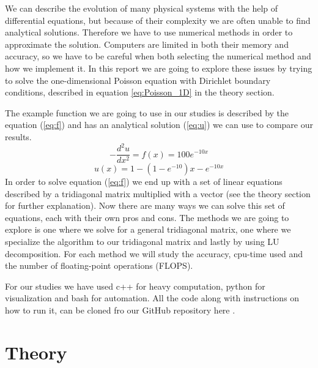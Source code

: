 \documentclass[reprint, english,notitlepage]{revtex4-1}  %
\begin{document}
We can describe the evolution of many physical systems with the help of differential equations, but because of their complexity we are often unable to find analytical solutions. Therefore we have to use numerical methods in order to approximate the solution. Computers are limited in both their memory and accuracy, so we have to be careful when both selecting the numerical method and how we implement it. In this report we are going to explore these issues by trying to solve the one-dimensional Poisson equation with Dirichlet boundary conditions, described in equation \ref{eq:Poisson_1D} in the theory section.

The example function we are going to use in our studies is described by the equation (\ref{eq:f}) and has an analytical solution (\ref{eq:u}) we can use to compare our results.
\begin{equation}
	-\frac{d^2u}{dx^2} = f(x) = 100e^{-10x}
	\label{eq:f}
\end{equation}
\begin{equation}
	u(x) = 1 - (1 - e^{-10})x - e^{-10x}
	\label{eq:u}
\end{equation}
In order to solve equation (\ref{eq:f}) we end up with a set of linear equations described by a tridiagonal matrix multiplied with a vector (see the theory section for further explanation). Now there are many ways we can solve this set of equations, each with their own pros and cons. The methods we are going to explore is one where we solve for a general tridiagonal matrix, one where we specialize the algorithm to our tridiagonal matrix and lastly by using LU decomposition. For each method we will study the accuracy, cpu-time used and the number of floating-point operations (FLOPS).

For our studies we have used c++ for heavy computation, python for visualization and bash for automation. All the code along with instructions on how to run it, can be cloned fro our GitHub repository here \citep{github}.

\section{Theory}
\end{document}
